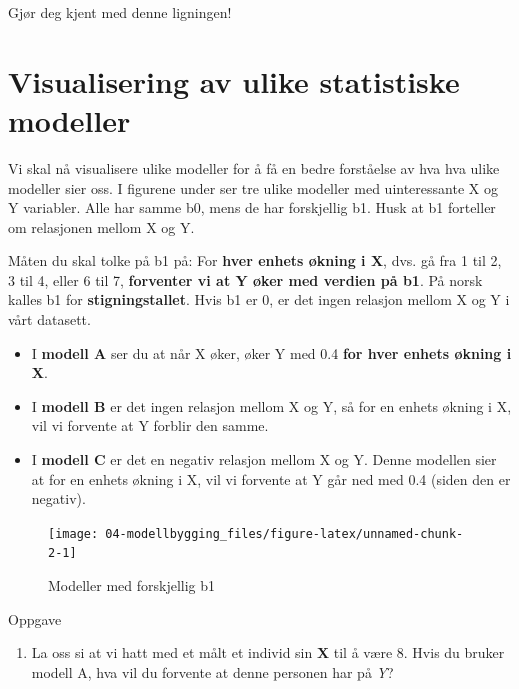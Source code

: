 \documentclass[
]{book}
\providecommand{\tightlist}{%
  \setlength{\itemsep}{0pt}\setlength{\parskip}{0pt}}
\begin{document}
Gjør deg kjent med denne ligningen!

\hypertarget{visualisering-av-ulike-statistiske-modeller}{%
\section{Visualisering av ulike statistiske modeller}\label{visualisering-av-ulike-statistiske-modeller}}

Vi skal nå visualisere ulike modeller for å få en bedre forståelse av hva hva ulike modeller sier oss. I figurene under ser tre ulike modeller med uinteressante X og Y variabler. Alle har samme b0, mens de har forskjellig b1. Husk at b1 forteller om relasjonen mellom X og Y.

Måten du skal tolke på b1 på: For \textbf{hver enhets økning i X}, dvs. gå fra 1 til 2, 3 til 4, eller 6 til 7, \textbf{forventer vi at Y øker med verdien på b1}. På norsk kalles b1 for \textbf{stigningstallet}. Hvis b1 er 0, er det ingen relasjon mellom X og Y i vårt datasett.

\begin{itemize}
\item
  I \textbf{modell A} ser du at når X øker, øker Y med 0.4 \textbf{for hver enhets økning i X}.
\item
  I \textbf{modell B} er det ingen relasjon mellom X og Y, så for en enhets økning i X, vil vi forvente at Y forblir den samme.
\item
  I \textbf{modell C} er det en negativ relasjon mellom X og Y. Denne modellen sier at for en enhets økning i X, vil vi forvente at Y går ned med 0.4 (siden den er negativ).
\end{itemize}

\begin{figure}

{\centering \texttt{[image: 04-modellbygging\_files/figure-latex/unnamed-chunk-2-1]} 

}

\caption{Modeller med forskjellig b1}\label{fig:unnamed-chunk-2}
\end{figure}

{Oppgave}

\begin{enumerate}
\def\labelenumi{\alph{enumi}.}
\tightlist
\item
  La oss si at vi hatt med et målt et individ sin \textbf{X} til å være 8. Hvis du bruker modell A, hva vil du forvente at denne personen har på \emph{Y}?
\end{enumerate}
\end{document}
